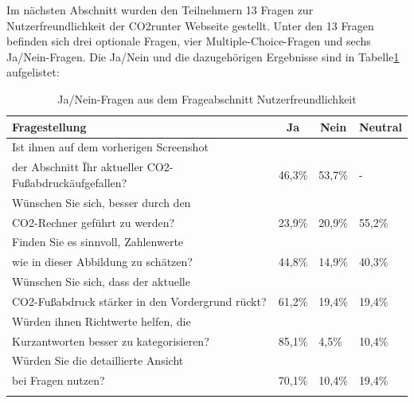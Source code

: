 Im nächsten Abschnitt wurden den Teilnehmern 13 Fragen zur Nutzerfreundlichkeit der CO2runter Webseite gestellt.
Unter den 13 Fragen befinden sich drei optionale Fragen, vier Multiple-Choice-Fragen und sechs Ja/Nein-Fragen.
Die Ja/Nein und die dazugehörigen Ergebnisse sind in Tabelle\ref{nutzerfreundlichkeitFragen} aufgelistet:
\begin{longtable}{@{\extracolsep{\fill}}|l|l|l|l@{}}
    \hline
    \multicolumn{1}{|l|}{\textbf{Fragestellung}} &
    \multicolumn{1}{c|}{\textbf{Ja}} &
    \multicolumn{1}{c|}{\textbf{Nein}} &
    \multicolumn{1}{r|}{\textbf{Neutral}} \\ \hline
    \endfirsthead

    Ist ihnen auf dem vorherigen Screenshot\\der Abschnitt \"Ihr aktueller CO2-Fußabdruck\" aufgefallen?& 46,3\% & 53,7\% & - \\ \hline
    Wünschen Sie sich, besser durch den\\CO2-Rechner geführt zu werden?& 23,9\% & 20,9\% & 55,2\%  \\ \hline
    Finden Sie es sinnvoll, Zahlenwerte\\wie in dieser Abbildung zu schätzen?& 44,8\% & 14,9\% & 40,3\%  \\ \hline
    Wünschen Sie sich, dass der aktuelle\\CO2-Fußabdruck stärker in den Vordergrund rückt?& 61,2\% & 19,4\% & 19,4\%  \\ \hline
    Würden ihnen Richtwerte helfen, die\\Kurzantworten besser zu kategorisieren?& 85,1\% & 4,5\% & 10,4\%  \\ \hline
    Würden Sie die detaillierte Ansicht\\ bei Fragen nutzen?& 70,1\% & 10,4\% & 19,4\%  \\ \hline
    \caption{Ja/Nein-Fragen aus dem Frageabschnitt Nutzerfreundlichkeit}
    \label{nutzerfreundlichkeitFragen}
    \\
\end{longtable}

